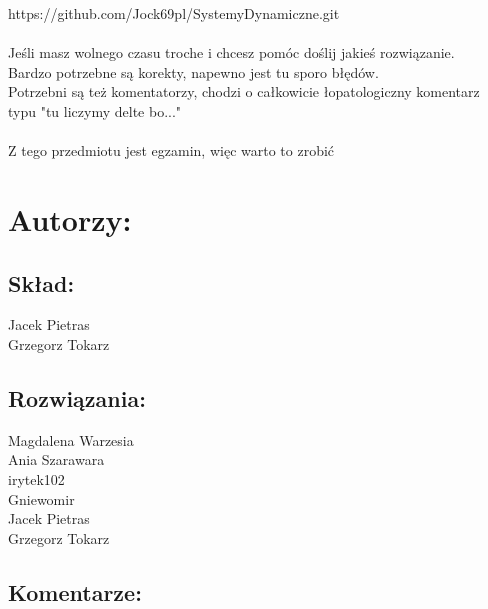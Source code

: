 \documentclass[a4paper,10pt]{article}
\begin{document}
\noindent https://github.com/Jock69pl/SystemyDynamiczne.git\\
\\
Jeśli masz wolnego czasu troche i chcesz pomóc doślij jakieś rozwiązanie.\\
Bardzo potrzebne są korekty, napewno jest tu sporo błędów.\\
Potrzebni są też komentatorzy, chodzi o całkowicie łopatologiczny komentarz typu "tu liczymy delte bo..."\\
\\
Z tego przedmiotu jest egzamin, więc warto to zrobić





 

\pagebreak
\section*{Autorzy:}

\subsection*{Skład:} 
Jacek Pietras\\
Grzegorz Tokarz

\subsection*{Rozwiązania:} 
Magdalena Warzesia\\
Ania Szarawara\\
irytek102\\
Gniewomir\\
Jacek Pietras\\
Grzegorz Tokarz

\subsection*{Komentarze:} 
\end{document}
